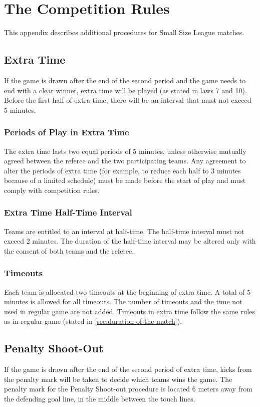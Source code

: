 \section{The Competition Rules}\label{app:competition-rules}

This appendix describes additional procedures for Small Size League matches.

\subsection{Extra Time}
If the game is drawn after the end of the second period and the game needs to end with a clear winner, extra time will be played (as stated in laws 7 and 10).
Before the first half of extra time, there will be an interval that must not exceed 5 minutes.

\subsubsection{Periods of Play in Extra Time}
The extra time lasts two equal periods of 5 minutes, unless otherwise mutually agreed between the referee and the two participating teams.
Any agreement to alter the periods of extra time (for example, to reduce each half to 3 minutes because of a limited schedule) must be made before the start of play and must comply with competition rules.

\subsubsection{Extra Time Half-Time Interval}
Teams are entitled to an interval at half-time.
The half-time interval must not exceed 2 minutes.
The duration of the half-time interval may be altered only with the consent of both teams and the referee.

\subsubsection{Timeouts}
Each team is allocated two timeouts at the beginning of extra time.
A total of 5 minutes is allowed for all timeouts.
The number of timeouts and the time not used in regular game are not added.
Timeouts in extra time follow the same rules as in regular game (stated in \autoref{sec:duration-of-the-match}).

\subsection{Penalty Shoot-Out}
If the game is drawn after the end of the second period of extra time, kicks from the penalty mark will be taken to decide which teams wins the game.
The penalty mark for the Penalty Shoot-out procedure is located  6 meters
away  from the defending goal line, in the middle between the touch lines.


